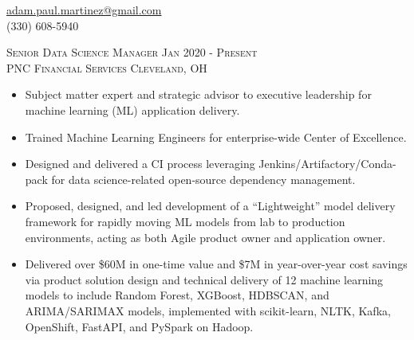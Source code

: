 \documentclass[letterpaper, 10pt]{article} %
\begin{document}
\pagestyle{empty}  %

\topskip 0pt
\vspace*{\fill}  %



\vspace{-0.5em}

\begin{center}
\href{mailto:adam.paul.martinez@gmail.com}{adam.paul.martinez@gmail.com} \\
(330) 608-5940
\end{center}

\vspace{0.5em}

\justify

\textsc{Senior Data Science Manager \hfill Jan 2020 - Present} \\
\textsc{PNC Financial Services \hfill Cleveland, OH}
\begin{itemize}
 \item Subject matter expert and strategic advisor to executive leadership for machine learning (ML) application delivery.
 \item Trained Machine Learning Engineers for enterprise-wide Center of Excellence.
 \item Designed and delivered a CI process leveraging Jenkins/Artifactory/Conda-pack for data science-related open-source dependency management.
 \item Proposed, designed, and led development of a ``Lightweight'' model delivery framework for rapidly moving ML models from lab to production environments, acting as both Agile product owner and application owner.
 \item Delivered over \$60M in one-time value and \$7M in year-over-year cost savings via product solution design and technical delivery of 12 machine learning models to include Random Forest, XGBoost, HDBSCAN, and ARIMA/SARIMAX models, implemented with scikit-learn, NLTK, Kafka, OpenShift, FastAPI, and PySpark on Hadoop.
\end{itemize}
\end{document}
